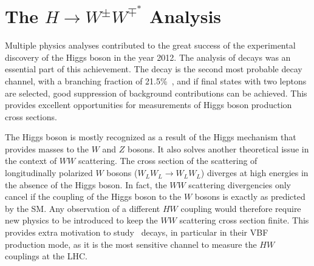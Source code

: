 \chapter{The $H\rightarrow W^{\pm}W^{\mp^*}$ Analysis}
\label{chap:hww}

Multiple physics analyses contributed to the great success of the experimental discovery of the Higgs boson in the year 2012. The analysis of \HWW decays was an essential part of this achievement. 
The \HWW decay is the second most probable decay channel, with a branching fraction of 21.5\%~\cite{PDG2020}, and if final states with two leptons are selected, good suppression of background contributions can be achieved.
This provides excellent opportunities for measurements of Higgs boson production cross sections.

The Higgs boson is mostly recognized as a result of the Higgs mechanism that provides masses to the $W$ and $Z$ bosons. 
It also solves another theoretical issue in the context of $WW$ scattering.
The cross section of the scattering of longitudinally polarized $W$ bosons ($W_LW_L \to W_LW_L$) diverges at high energies in the absence of the Higgs boson. In fact, the $WW$ scattering divergencies only cancel if the coupling of the Higgs boson to the $W$ bosons is exactly as predicted by the SM. Any observation of a different $HW$ coupling would therefore require new physics to be introduced to keep the $WW$ scattering cross section finite. 
This provides extra motivation to study \HWW\ decays, in particular in their VBF production mode, as it is the most sensitive channel to measure the $HW$ couplings at the LHC.

